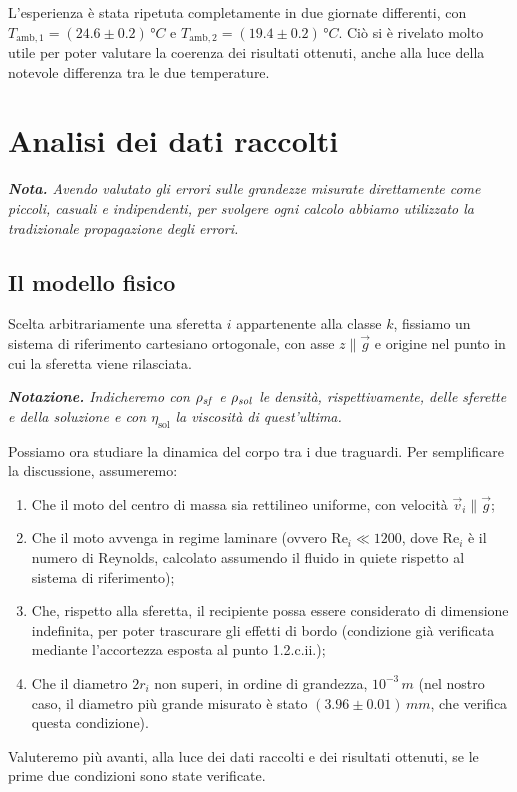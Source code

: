 \documentclass{article}
\begin{document}
L'esperienza è stata ripetuta completamente in due giornate differenti,
con $T_{\text{amb},1} = (24.6\pm0.2)\,\unit{\degree C}$
e $T_{\text{amb},2} = (19.4\pm0.2)\,\unit{\degree C}$.
Ciò si è rivelato molto utile per poter valutare la
coerenza dei risultati ottenuti, anche alla luce della
notevole differenza tra le due temperature.


\section{Analisi dei dati raccolti}
\emph{\textbf{Nota.}
Avendo valutato gli errori sulle grandezze misurate direttamente
come piccoli, casuali e indipendenti, per svolgere ogni calcolo
abbiamo utilizzato la tradizionale propagazione degli errori.
}

\subsection{Il modello fisico}

Scelta arbitrariamente una sferetta $i$ appartenente alla classe $k$,
fissiamo un sistema di riferimento cartesiano ortogonale, con asse
$z\parallel\vec{g}$ e origine nel punto in cui la sferetta viene rilasciata.

\vspace{2mm}
\emph{
  \textbf{Notazione.} Indicheremo con $\rho_\text{\emph{sf}}$ e
  $\rho_\text{\emph{sol}}$ le densità, rispettivamente, delle sferette
  e della soluzione e con $\eta_\text{sol}$ la viscosità di quest'ultima.
}
\vspace{2mm}

Possiamo ora studiare la dinamica del corpo tra i due traguardi.
Per semplificare la discussione, assumeremo:
\begin{enumerate}
  \item Che il moto del centro di massa sia rettilineo uniforme,
    con velocità $\vec{v}_i\parallel\vec{g}$;
  \item Che il moto avvenga in regime laminare
    (ovvero $\text{Re}_i \ll 1200$, dove $\text{Re}_i$ è il numero di
    Reynolds, calcolato assumendo il fluido in quiete rispetto al
    sistema di riferimento);
  \item Che, rispetto alla sferetta, il recipiente possa essere
    considerato di dimensione indefinita, per poter trascurare gli effetti
    di bordo (condizione già verificata mediante l'accortezza esposta
    al punto 1.2.c.ii.);
  \item Che il diametro $2r_i$ non superi, in ordine di grandezza,
    $10^{-3}\,\unit{m}$ (nel nostro caso, il diametro più grande misurato
    è stato $(3.96\pm0.01)\,\unit{mm}$, che verifica questa condizione).
\end{enumerate}
Valuteremo più avanti, alla luce dei dati raccolti e dei risultati ottenuti,
se le prime due condizioni sono state verificate.
\end{document}
